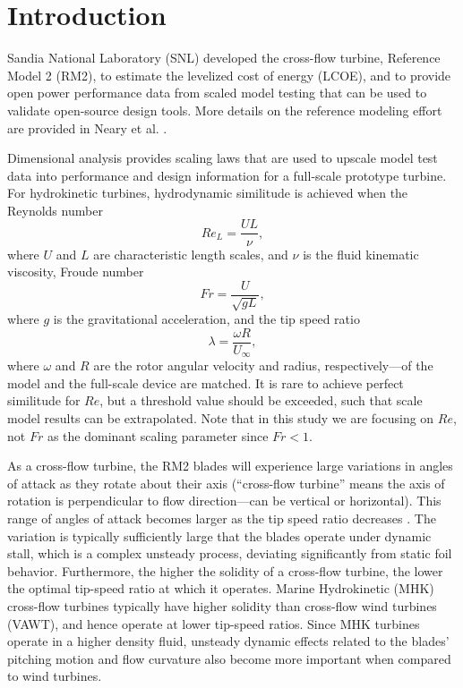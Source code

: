 \documentclass[12pt,letterpaper]{scrreprt}
\begin{document}
\tableofcontents

\newpage
\listoftodos

\chapter{Introduction}

Sandia National Laboratory (SNL) developed the cross-flow turbine, Reference
Model 2 (RM2), to estimate the levelized cost of energy (LCOE), and to provide
open power performance data from scaled model testing that can be used to
validate open-source design tools.  More details on the reference modeling
effort are provided in Neary et al. \cite{Neary2014}.

Dimensional analysis provides scaling laws that are used to upscale model test
data into performance and design information for a full-scale prototype turbine.
For hydrokinetic turbines, hydrodynamic similitude is achieved when the Reynolds
number
\begin{equation}
Re_L = \frac{UL}{\nu},
\label{eq-Re}
\end{equation}
where $U$ and $L$ are characteristic length scales, and $\nu$ is the fluid
kinematic viscosity, Froude number
\begin{equation}
Fr = \frac{U}{\sqrt{gL}},
\label{eq-Fr}
\end{equation}
where $g$ is the gravitational acceleration, and the tip speed ratio
\begin{equation}
\lambda=\frac{\omega R}{U_\infty},
\end{equation}
where $\omega$ and $R$ are the rotor angular velocity and radius,
respectively---of the model and the full-scale device are matched. It is rare to
achieve perfect similitude for $Re$, but a threshold value should be exceeded,
such that scale model results can be extrapolated. Note that in this study we
are focusing on $Re$, not $Fr$ as the dominant scaling parameter since $Fr <
1$.

As a cross-flow turbine, the RM2 blades will experience large variations in
angles of attack as they rotate about their axis (``cross-flow turbine'' means
the axis of rotation is perpendicular to flow direction---can be vertical or
horizontal). This range of angles of attack becomes larger as the tip speed
ratio decreases \cite{Para2002}. The variation is typically sufficiently large
that the blades operate under dynamic stall, which is a complex unsteady
process, deviating significantly from static foil behavior. Furthermore, the
higher the solidity of a cross-flow turbine, the lower the optimal tip-speed
ratio at which it operates. Marine Hydrokinetic (MHK) cross-flow turbines
typically have higher solidity than cross-flow wind turbines (VAWT), and hence
operate at lower tip-speed ratios. Since MHK turbines operate in a higher
density fluid, unsteady dynamic effects related to the blades' pitching motion
and flow curvature also become more important when compared to wind turbines.
\end{document}
